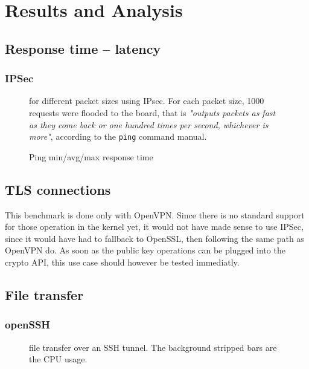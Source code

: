 \chapter{Results and Analysis}\label{chap:results}

\section{Response time -- latency}

\subsection{IPSec}

\begin{figure}[ht]

\caption{Ping min/avg/max response time}{for different packet sizes using IPsec. For each packet size, 1000 requests were flooded to the board, that is \textit{"outputs packets as fast as they come back or one hundred times per second, whichever is more"}, according to the \texttt{ping} command manual.}
\label{fig:ping-benchmark-ipsec}
\end{figure}

\section{TLS connections}

This benchmark is done only with OpenVPN.
Since there is no standard support for those operation in the kernel yet, it would not have made sense to use IPSec, since it would have had to fallback to OpenSSL, then following the same path as OpenVPN do.
As soon as the public key operations can be plugged into the crypto API, this use case should however be tested immediatly.

\section{File transfer}


\subsection{openSSH}

\begin{figure}[ht]

\caption{file transfer over an SSH tunnel. The background stripped bars are the CPU usage.}{}
\label{fig:openssh-bench}
\end{figure}

